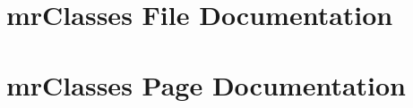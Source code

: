 \documentclass[a4paper]{book}
\begin{document}
\chapter{mr\-Classes File Documentation}












































\chapter{mr\-Classes Page Documentation}

\printindex
\end{document}
